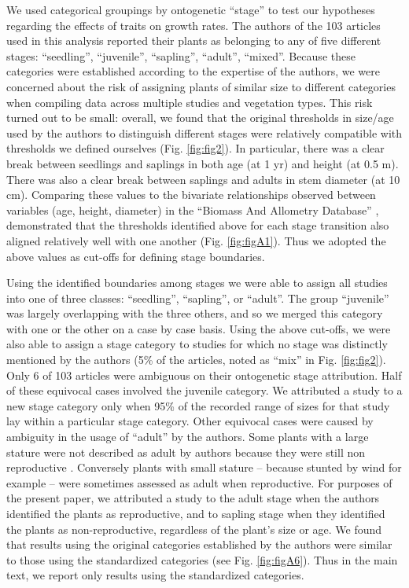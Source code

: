 \documentclass[a4paper,11pt]{article}
\begin{document}
We used categorical groupings by ontogenetic ``stage'' to test our hypotheses regarding the effects of traits on growth rates. The authors of the 103 articles used in this analysis reported their plants as belonging to any of five different stages: ``seedling'', ``juvenile'', ``sapling'', ``adult'', ``mixed''. Because these categories were established according to the expertise of the authors, we were concerned about the risk of assigning plants of similar size to different categories when compiling data across multiple studies and vegetation types. This risk turned out to be small: overall, we found that the original thresholds in size/age used by the authors to distinguish different stages were relatively compatible with thresholds we defined ourselves (Fig. \ref{fig:fig2}). In particular, there was a clear break between seedlings and saplings in both age (at 1 yr) and height (at 0.5 m). There was also a clear break between saplings and adults in stem diameter (at 10 cm). Comparing these values to the bivariate relationships observed between variables (age, height, diameter) in the ``Biomass And Allometry Database'' \citep{Falster:2015}, demonstrated that the thresholds identified above for each stage transition also aligned relatively well with one another (Fig. \ref{fig:figA1}). Thus we adopted the above values as cut-offs for defining stage boundaries.

Using the identified boundaries among stages we were able to assign all studies into one of three classes: ``seedling'', ``sapling'', or ``adult''. The group ``juvenile'' was largely overlapping with the three others, and so we merged this category with one or the other on a case by case basis. Using the above cut-offs, we were also able to assign a stage category to studies for which no stage was distinctly mentioned by the authors (5\% of the articles, noted as ``mix'' in Fig. \ref{fig:fig2}). Only 6 of 103 articles were ambiguous on their ontogenetic stage attribution. Half of these equivocal cases involved the juvenile category. We attributed a study to a new stage category only when 95\% of the recorded range of sizes for that study lay within a particular stage category. Other equivocal cases were caused by ambiguity in the usage of ``adult'' by the authors. Some plants with a large stature were not described as adult by authors because they were still non reproductive \citep{King:2006he}. Conversely plants with small stature -- because stunted by wind for example \citep{Stratton:2001ck} -- were sometimes assessed as adult when reproductive. For purposes of the present paper, we attributed a study to the adult stage when the authors identified the plants as reproductive, and to sapling stage when they identified the plants as non-reproductive, regardless of the plant's size or age. We found that results using the original categories established by the authors were similar to those using the standardized categories (see Fig. \ref{fig:figA6}). Thus in the main text, we report only results using the standardized categories.
\end{document}
